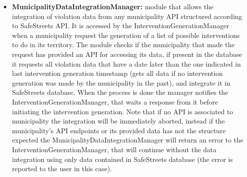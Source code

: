 \begin{itemize}
	\item \textbf{MunicipalityDataIntegrationManager:}
	module that allows the integration of violation data from any municipality API structured according to SafeStreets API. It is accessed by the InterventionGenerationManager when a municipality request the generation of a list of possible interventions to do in its territory. The module checks if the municipality that made the request has provided an API for accessing its data, if present in the database it requests all violation data that have a date later than the one indicated in last intervention generation timestamp (gets all data if no intervention generation was made by the municipality in the past), and integrate it in SafeStreets database. When the process is done the manager notifies the InterventionGenerationManager, that waits a response from it before initiating the intervention generation. Note that if no API is associated to municipality the integration will be immediately aborted, instead if the municipality's API endpoints or its provided data has not the structure expected the MunicipalityDataIntegrationManager will return an error to the InterventionGenerationManager, that will continue without the data integration using only data contained in SafeStreets database (the error is reported to the user in this case).
\end{itemize}